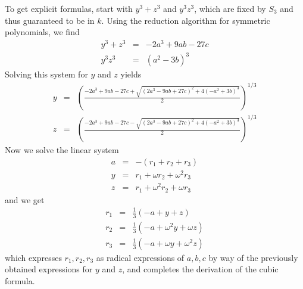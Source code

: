 \documentclass{article}
\begin{document}
To get explicit formulas, start with $y^3 + z^3$ and $y^3 z^3$, which are fixed by $S_3$ and thus guaranteed to be in $k$. Using the reduction algorithm for symmetric polynomials, we find
\begin{eqnarray*}
y^3 + z^3 & = & -2a^3 + 9ab - 27c \\
y^3 z^3 & = & (a^2 - 3b)^3
\end{eqnarray*}
Solving this system for $y$ and $z$ yields
\begin{eqnarray*}
y & = & \left(\frac{-2a^3 + 9ab - 27c + \sqrt{(2a^3-9ab+27c)^2 + 4(-a^2+3b)^3}}{2}\right)^{1/3} \\
z & = & \left(\frac{-2a^3 + 9ab - 27c - \sqrt{(2a^3-9ab+27c)^2 + 4(-a^2+3b)^3}}{2}\right)^{1/3}
\end{eqnarray*}
Now we solve the linear system
\begin{eqnarray*}
a & = & -(r_1+r_2+r_3) \\
y & = & r_1 + \omega r_2 + \omega^2 r_3 \\
z & = & r_1 + \omega^2 r_2 + \omega r_3
\end{eqnarray*}
and we get
\begin{eqnarray*}
r_1 & = & \frac{1}{3} (-a + y + z) \\
r_2 & = & \frac{1}{3} (-a + \omega^2 y + \omega z) \\
r_3 & = & \frac{1}{3} (-a + \omega y + \omega^2 z)
\end{eqnarray*}
which expresses $r_1, r_2, r_3$ as radical expressions of $a,b,c$ by way of the previously obtained expressions for $y$ and $z$, and completes the derivation of the cubic formula.
\end{document}
